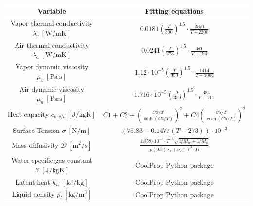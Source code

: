 \documentclass[12pt]{article}
\numberwithin{equation}{section}
\begin{document}
\begin{appendices}
\begin{table}[H]
\begin{tabular}{||c|c||}
    \hline
    \textbf{Variable} & \textbf{Fitting equations} \\ \hline\hline
    Vapor thermal conductivity \cite{Sutherlands_law} $\lambda_{v}\: \mathrm{[W/mK]}$     &      $0.0181\left(\frac{T}{300}\right)^{1.5}\cdot\frac{2550}{T+2200}$           \\\hline
    Air thermal conductivity \cite{Sutherlands_law} $\lambda_{a}\: \mathrm{[W/mK]}$     &      $0.0241\left(\frac{T}{273}\right)^{1.5}\cdot\frac{461}{T+194}$           \\\hline
    Vapor dynamic viscosity \cite{Sutherlands_law} $\mu_{v}\:\mathrm{[Pa\:s]}$      &   $1.12\cdot10^{-5}\left(\frac{T}{350}\right)^{1.5}\cdot\frac{1414}{T+1064}$           \\\hline
    Air dynamic viscosity \cite{Sutherlands_law} $\mu_{a}\:\mathrm{[Pa\:s]}$      &   $1.716\cdot10^{-5}\left(\frac{T}{350}\right)^{1.5}\cdot\frac{384}{T+111}$           \\\hline
    Heat capacity \cite[T. 2-150]{doble2007perry} $c_{p,v/a}\:\mathrm{[J/kgK]}$      &   $C1+C2+\left(\frac{C3/T}{\sinh (C3/T)}\right)^{2}+C4\left(\frac{C5/T}{\cosh (C5/T)}\right)^{2}$           \\\hline
    Surface Tension \cite{doble2007perry} $\sigma\:\mathrm{[N/m]}$      &   $(75.83-0.1477(T-273))\cdot 10^{-3}$           \\\hline
    Mass diffusivity \cite{vCalc_2022} $\mathcal{D}\:\mathrm{[m^{2}/s]}$      &   $\frac{1.858\cdot 10^{-3}\cdot T^{1.5}\sqrt{1/M_{w}+1/M_{a}}}{p(0.5(\sigma_{1}+\sigma_{2}))^{2}\cdot \Omega}$           \\\hline
    Water specific gas constant \cite{doi:10.1021/ie4033999} $R\:\mathrm{[J/kgK]}$      &       CoolProp Python package         \\ \hline
    Latent heat \cite{doi:10.1021/ie4033999} $h_{vl}\:\mathrm{[kJ/kg]}$        &   CoolProp Python package                 \\ \hline
    Liquid density \cite{doi:10.1021/ie4033999} $\rho_{l}\:\mathrm{[kg/m^{3}]}$        &    CoolProp Python package               \\\hline
  
    \end{tabular}
    \label{t:perry_calcs}
\end{table}
\end{appendices}
\pagebreak
\end{document}
